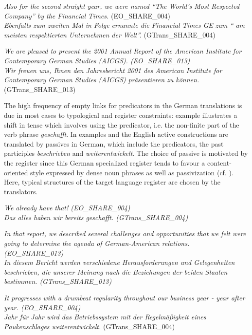 \documentclass[output=paper]{LSP/langsci}
\begin{document}
\ea \label{ex:culo:4}
   \ea \textit{Also for the second straight year, we were named ``The World's Most Respected Company'' by the Financial Times.} (EO\_SHARE\_004) \\
   \ex 
   \textit{Ebenfalls zum zweiten Mal in Folge ernannte die Financial Times GE zum `` am meisten respektierten Unternehmen der Welt''.} (GTrans\_SHARE\_004)
   \z
\z
 
 
\ea \label{ex:culo:5}
  \ea \textit{We are pleased to present the 2001 Annual Report of the American Institute for   Contemporary German Studies (AICGS). \textup{(EO\_SHARE\_013)}}\\
   \ex \textit{Wir freuen uns, Ihnen den Jahresbericht 2001 des American Institute for Contemporary   German Studies (AICGS) präsentieren zu können.} (GTrans\_SHARE\_013) 
   \z
\z

The high frequency of empty links for predicators in the German translations is due in most cases to typological and register constraints: example  illustrates a shift in tense which involves using the predicator, i.e. the non-finite part of the verb phrase \textit{geschafft}. In examples  and  the English active constructions are translated by passives in German, which include the predicators, the past participles \textit{beschrieben} and \textit{weiterentwickelt}. The choice of passive is motivated by the register since this German specialized register tends to favour a content-oriented style expressed by dense noun phrases as well as passivization (cf. \citealt{Neumann2008}). Here, typical structures of the target language register are chosen by the translators. 

\ea \label{ex:culo:6}
  \ea  \textit{We already have that! \textup{(EO\_SHARE\_004)}}\\
   \ex \textit{Das alles haben wir bereits geschafft. \textup{(GTrans\_SHARE\_004)}}
   \z
\z


\ea \label{ex:culo:7}
  \ea \textit{In that report, we described several challenges and opportunities that we felt were   going to determine the agenda of German-American relations. \textup{(EO\_SHARE\_013)}} \\
   \ex \textit{In diesem Bericht werden verschiedene Herausforderungen und Gelegenheiten beschrieben, die unserer Meinung nach die Beziehungen der beiden Staaten bestimmen. \textup{(GTrans\_SHARE\_013)}}
   \z
\z


\ea \label{ex:culo:8}
   \ea \textit{It progresses with a drumbeat regularity throughout our business year - year after year. \textup{(EO\_SHARE\_004)}}\\
    \ex \textit{Jahr für Jahr wird das Betriebssystem mit der Regelmäßigkeit eines Paukenschlages weiterentwickelt.} \textup{(GTrans\_SHARE\_004)} 
    \z
\z
\end{document}
